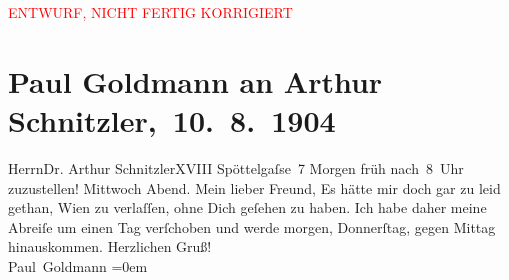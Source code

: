 
\begin{center}
            \textcolor{red}{ENTWURF, NICHT FERTIG KORRIGIERT}
                      \end{center}
            
         \renewcommand{\erwaehnteOrte}{Orte: Edmund-Weiß-Gasse, Wien}
         \renewcommand{\erwaehnteWerke}{}
               \section[ Paul Goldmann an Arthur Schnitzler, 10. 8. 1904]{ Paul Goldmann an Arthur Schnitzler, 10. 8. 1904}\nopagebreak{}\rehead{ }\begin{ledgroupsized}[t]{13cm}\normalsize\beginnumbering \toendnotes[C]{\smallbreak\pagebreak[2]} 
\toendnotes[C]{\smallbreak}\pstart{}{\pb}Herrn\pend{}\pstart{}Dr. Arthur Schnitzler\pend{}\pstart{}XVIII Spöttelgaſse 7\pend{}{\bigskip}\pstart
           \noindent{}Morgen{ }früh nach 8 Uhr zuzustellen!\pend
           \pstart
           {\pb}Mittwoch{ }Abend.\pend
           \pstart{}Mein lieber Freund,\pend\pstart
           Es hätte mir doch gar zu leid gethan, Wien zu
               verlaſſen, ohne Dich geſehen zu haben. Ich habe daher meine Abreiſe um einen Tag
               verſchoben und werde morgen, Donnerſtag, gegen
                  Mittag{ }\label{K_L03450-1v}\label{K_L03450-1h} hinauskommen.\pend
           \pstart
           Herzlichen Gruß! {\\[\baselineskip]}\spacefill\mbox{Paul Goldmann}\pend
           \leftskip=0em{}
         
         \endnumbering{}\end{ledgroupsized}\begin{anhang}\end{anhang}\newcommand{\dateiname}{L03450}\newcommand{\titel}{Paul Goldmann an Arthur Schnitzler, 10. 8. 1904}\newcommand{\editorInnen}{Martin Anton Müller und Laura Untner}
      